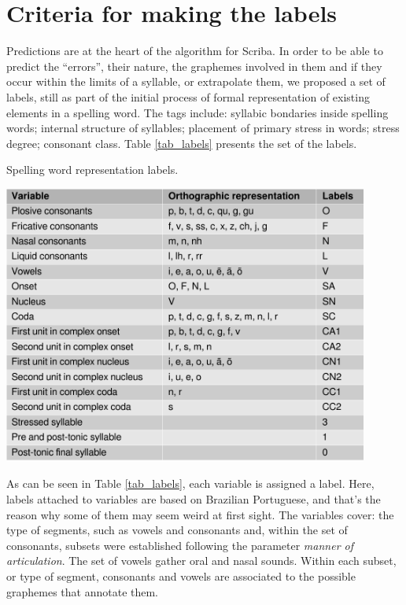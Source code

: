\section{Criteria for making the labels}

Predictions are at the heart of the algorithm for Scriba. In order to be able to predict the ``errors'', their nature, the graphemes involved in them and if they occur within the limits of a syllable, or extrapolate them, we proposed a set of labels, still as part of the initial process of formal representation of existing elements in a spelling word. The tags include: syllabic bondaries inside spelling words; internal structure of syllables; placement of primary stress in words; stress degree; consonant class. Table \ref{tab_labels} presents the set of the labels.

\begin{table}[!ht]
\caption{Spelling word representation labels.}
\label{tab_labels}
\centering
\includegraphics[width=0.9\textwidth]{imgs/adelaideherci14-labels.pdf}
\end{table}

As can be seen in Table \ref{tab_labels}, each variable is assigned a label. Here, labels attached to variables are based on Brazilian Portuguese, and that's the reason why some of them may seem weird at first sight. The variables cover: the type of segments, such as vowels and consonants and, within the set of consonants, subsets were established following the parameter \emph{manner of articulation}. The set of vowels gather oral and nasal sounds. Within each subset, or type of segment, consonants and vowels are associated to the possible graphemes that annotate them.

